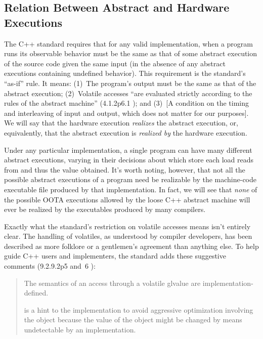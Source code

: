 \subsection{Relation Between Abstract and Hardware Executions}
\label{sec:Relation Between Abstract and Hardware Executions}

The C++ standard requires that for any valid implementation, when a
program runs its observable behavior must be the same as that of some
abstract execution of the source code given the same input (in the
absence of any abstract executions containing undefined behavior).
This requirement is the standard's ``as-if'' rule.
It means:
(1)~The program's output must be the same as that of the abstract execution;
(2)~Volatile accesses ``are evaluated strictly according to the
rules of the abstract machine'' (4.1.2p6.1 ); and
(3)~[A condition on the timing and interleaving of input and output,
which does not matter for our purposes].
We will say that the hardware execution \emph{realizes} the abstract execution,
or, equivalently, that the abstract execution is \emph{realized by}
the hardware execution.

Under any particular implementation,
a single program can have many different abstract executions,
varying in their decisions about which store each load reads from
and thus the value obtained.
It's worth noting, however, that not all the possible abstract executions
of a program need be realizable by the machine-code executable file
produced by that implementation.
In fact, we will see that \emph{none} of the possible OOTA executions
allowed by the loose C++ abstract machine will ever be realized
by the executables produced by many compilers.

Exactly what the standard's restriction on volatile accesses means
isn't entirely clear.
The handling of volatiles, as understood by compiler developers, has
been described as more folklore or a gentlemen's agreement than
anything else.
To help guide C++ users and implementers, the standard adds these
suggestive comments (9.2.9.2p5 and~6 ):
\begin{quote}
	The semantics of an access through a volatile glvalue are
	implementation-defined.

	 is a hint to the implementation to avoid aggressive
	optimization involving the object because the value of the object
	might be changed by means undetectable by an implementation.
\end{quote}

